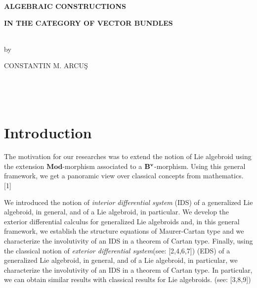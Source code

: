 \documentclass[11pt]{article}
\begin{document}
\begin{center}
\textbf{ALGEBRAIC CONSTRUCTIONS }

\textbf{IN THE CATEGORY OF VECTOR BUNDLES} \ \ \\[0pt]
\ \ %


by


{CONSTANTIN M. ARCU\c{S} }
\end{center}



\begin{abstract}
In this paper we present the category of generalized Lie algebroids.
Important results (a theorem of Maurer-Cartan type, theorems of Cartan
type,...) emphasize the importance and the utility of the objects of this
new category. \ \ \bigskip\newline
\textbf{2000 Mathematics Subject Classification:} 00A69, 58A15,
58B34.\bigskip\newline
\ \ \ \textbf{Keywords:} vector bundle, (generalized) Lie algebroid,
interior differential system, exterior differential calculus, exterior
differential system.
\end{abstract}
\
\
\tableofcontents
\


%


\ \

\section{Introduction}

The motivation for our researches was to extend the notion of Lie algebroid
using the extension $\mathbf{Mod}$-morphism associated to a $\mathbf{B}^{%
\mathbf{v}}$-morphism. Using this general framework, we get a panoramic view
over classical concepts from mathematics. [1]

We introduced the notion of \emph{interior differential system }(IDS) of a
generalized Lie algebroid, in general, and of a Lie algebroid, in
particular. We develop the exterior differential calculus for generalized
Lie algebroids and, in this general framework, we establish the structure
equations of Maurer-Cartan type and we characterize the involutivity of an
IDS in a theorem of Cartan type. Finally, using the classical notion of
\emph{exterior differential system}(see: [2,4,6,7]) (EDS) of a generalized
Lie algebroid, in general, and of a Lie algebroid, in particular, we
characterize the involutivity of an IDS in a theorem of Cartan type. In
particular, we can obtain similar results with classical results for Lie
algebroids. (see: [3,8,9])
\end{document}
